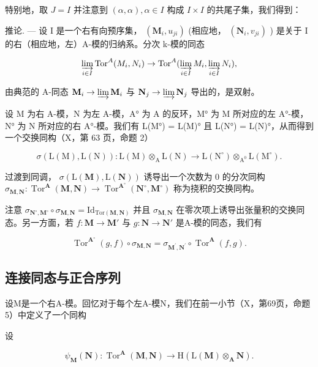 特别地，取 \(J = I\) 并注意到 \((\alpha, \alpha), \alpha \in I\) 构成 \(I \times I\) 的共尾子集，我们得到：

推论. --- 设 I 是一个右有向预序集， \((\mathbf{M}_{i}, u_{ji})\) (相应地， \((\mathbf{N}_{i}, v_{ji})\) ) 是关于 I 的右（相应地，左）A-模的归纳系。分次 k-模的同态

\[
\varinjlim_ {i \in I} \operatorname{Tor} ^ {A} (M _ {i}, N _ {i}) \rightarrow \operatorname{Tor} ^ {A} (\varinjlim_ {i \in I} M _ {i}, \varinjlim_ {i \in I} N _ {i}),
\]

由典范的 A-同态 \(\mathbf{M}_i\to \varinjlim \mathbf{M}_i\) 与 \(\mathbf{N}_j\to \varinjlim \mathbf{N}_j\) 导出的，是双射。

设 M 为右 A-模，N 为左 A-模，A° 为 A 的反环，M° 为 M 所对应的左 A°-模，N° 为 N 所对应的右 A°-模。我们有 L(M°) = L(M)° 且 L(N°) = L(N)°，从而得到一个交换同构（X，第 63 页，命题 2）

\[
\sigma (\mathrm{L} (\mathrm{M}), \mathrm{L} (\mathrm{N})): \mathrm{L} (\mathrm{M}) \otimes_ {\mathrm{A}} \mathrm{L} (\mathrm{N}) \rightarrow \mathrm{L} (\mathrm{N} ^ {\circ}) \otimes_ {\mathrm{A} ^ {0}} \mathrm{L} (\mathrm{M} ^ {\circ}).
\]

过渡到同调， \(\sigma(\mathrm{L}(\mathbf{M}),\mathrm{L}(\mathbf{N}))\) 诱导出一个次数为 0 的分次同构 \(\sigma_{\mathbf{M},\mathbf{N}}:\operatorname{Tor}^{\mathbf{A}}(\mathbf{M},\mathbf{N})\to\operatorname{Tor}^{\mathbf{A}^{\circ}}(\mathbf{N}^{\circ},\mathbf{M}^{\circ})\) 称为挠积的交换同构。

注意 \(\sigma_{\mathbf{N}^{\circ},\mathbf{M}^{\circ}}\circ\sigma_{\mathbf{M},\mathbf{N}}=\mathrm{Id}_{\mathrm{Tor}\left(\mathbf{M},\mathbf{N}\right)}\) 并且 \(\sigma_{\mathbf{M},\mathbf{N}}\) 在零次项上诱导出张量积的交换同态。另一方面，若 \(f:\mathbf{M}\to\mathbf{M}'\) 与 \(g:\mathbf{N}\to\mathbf{N}'\) 是A-模的同态，我们有

\[
\operatorname{Tor} ^ {\mathbf {A} ^ {\circ}} (g, f) \circ \sigma_ {\mathbf {M}, \mathbf {N}} = \sigma_ {\mathbf {M} ^ {\prime}, \mathbf {N} ^ {\prime}} \circ \operatorname{Tor} ^ {\mathbf {A}} (f, g).
\]

\subsection{连接同态与正合序列}

设M是一个右A-模。回忆对于每个左A-模N，我们在前一小节（X，第69页，命题5）中定义了一个同构

设

\[
\psi_ {\mathbf {M}} (\mathbf {N}): \operatorname{Tor} ^ {\mathbf {A}} (\mathbf {M}, \mathbf {N}) \rightarrow \mathrm{H} (\mathrm{L} (\mathbf {M}) \otimes_ {\mathbf {A}} \mathbf {N}).\tag{ε}
\]

